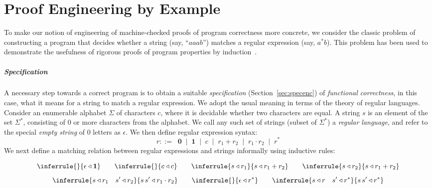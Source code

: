 \chapter{Proof Engineering by Example}
\label{ch:ex}

To make our notion of engineering of machine-checked proofs of program correctness more concrete, we consider the classic problem of constructing a program that decides whether a string (say, ``$aaab$'') matches a regular expression (say, $a^*b$). This problem has been used to demonstrate the usefulness of rigorous proofs of program properties by induction~\citep{Harper1999,Yi2006}.

\paragraph{Specification}
A necessary step towards a correct program is to obtain a suitable \emph{specification} (Section~\ref{sec:specenc}) of \emph{functional correctness}, in this case, what it means for a string to match a regular expression. We adopt the usual meaning in terms of the theory of regular languages. Consider an enumerable alphabet $\Sigma$ of characters $c$, where it is decidable whether two characters are equal. A string $s$ is an element of the set $\Sigma^*$, consisting of 0 or more characters from the alphabet. We call any such set of strings (subset of $\Sigma^*$) a \emph{regular language}, and refer to the special \emph{empty string} of 0 letters as $\epsilon$. We then define regular expression syntax:
\[
r ::= \;\; \textbf{0} \;\; | \;\; \textbf{1} \;\; | \;\; c \;\; | \;\; r_1 + r_2 \;\; | \;\; r_1 \cdot r_2 \;\; | \;\; r^*
\]
We next define a matching relation between regular expressions and strings informally using inductive rules:

\[
\inferrule{ }{\epsilon \triangleleft \mathbf{1}} \qquad \inferrule{ }{c \triangleleft c} \qquad \inferrule{s \triangleleft r_1}{s \triangleleft r_1 + r_2} \qquad \inferrule{s \triangleleft r_2}{s \triangleleft r_1 + r_2}
\]
\vspace{-3pt}
\[
\inferrule{s \triangleleft r_1 \quad s' \triangleleft r_2}{s\,s' \triangleleft r_1 \cdot r_2} \qquad \inferrule{ }{\epsilon \triangleleft r^*} \qquad \inferrule{s \triangleleft r \quad s' \triangleleft r^*}{s\,s' \triangleleft r^*}
\]

